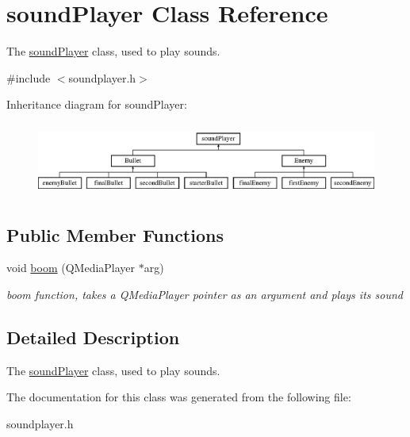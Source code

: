 \hypertarget{classsoundPlayer}{}\section{sound\+Player Class Reference}
\label{classsoundPlayer}


The \hyperlink{classsoundPlayer}{sound\+Player} class, used to play sounds.  




{\ttfamily \#include $<$soundplayer.\+h$>$}

Inheritance diagram for sound\+Player\+:\begin{figure}[H]
\begin{center}
\leavevmode
\includegraphics[height=2.424242cm]{classsoundPlayer}
\end{center}
\end{figure}
\subsection*{Public Member Functions}
\begin{DoxyCompactItemize}
\item 
\mbox{\label{classsoundPlayer_a1d187e2c442666b8faa74d07a3694edb}} 
void \hyperlink{classsoundPlayer_a1d187e2c442666b8faa74d07a3694edb}{boom} (Q\+Media\+Player $\ast$arg)
\begin{DoxyCompactList}\small\item\em boom function, takes a Q\+Media\+Player pointer as an argument and plays it\textquotesingle{}s sound \end{DoxyCompactList}\end{DoxyCompactItemize}


\subsection{Detailed Description}
The \hyperlink{classsoundPlayer}{sound\+Player} class, used to play sounds. 

The documentation for this class was generated from the following file\+:\begin{DoxyCompactItemize}
\item 
soundplayer.\+h\end{DoxyCompactItemize}
